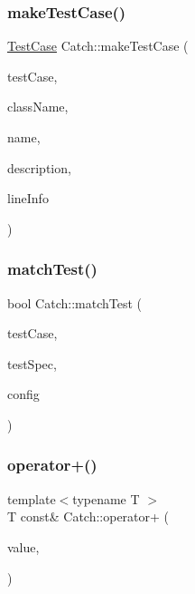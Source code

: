 \subsubsection{\texorpdfstring{make\+Test\+Case()}{makeTestCase()}}
{\footnotesize\ttfamily \mbox{\hyperlink{class_catch_1_1_test_case}{Test\+Case}} Catch\+::make\+Test\+Case (\begin{DoxyParamCaption}\item[{\mbox{\hyperlink{struct_catch_1_1_i_test_case}{I\+Test\+Case}} $\ast$}]{test\+Case,  }\item[{std\+::string const \&}]{class\+Name,  }\item[{std\+::string const \&}]{name,  }\item[{std\+::string const \&}]{description,  }\item[{\mbox{\hyperlink{struct_catch_1_1_source_line_info}{Source\+Line\+Info}} const \&}]{line\+Info }\end{DoxyParamCaption})}

\mbox{\label{namespace_catch_aadef80fbc6bc84589777a462770cef49}} 
\subsubsection{\texorpdfstring{match\+Test()}{matchTest()}}
{\footnotesize\ttfamily bool Catch\+::match\+Test (\begin{DoxyParamCaption}\item[{\mbox{\hyperlink{class_catch_1_1_test_case}{Test\+Case}} const \&}]{test\+Case,  }\item[{Test\+Spec const \&}]{test\+Spec,  }\item[{I\+Config const \&}]{config }\end{DoxyParamCaption})}

\mbox{\label{namespace_catch_a5e95b3c47a7618db3649dc39b0bb9004}} 
\subsubsection{\texorpdfstring{operator+()}{operator+()}}
{\footnotesize\ttfamily template$<$typename T $>$ \\
T const\& Catch\+::operator+ (\begin{DoxyParamCaption}\item[{T const \&}]{value,  }\item[{\mbox{\hyperlink{struct_catch_1_1_stream_end_stop}{Stream\+End\+Stop}}}]{ }\end{DoxyParamCaption})}

